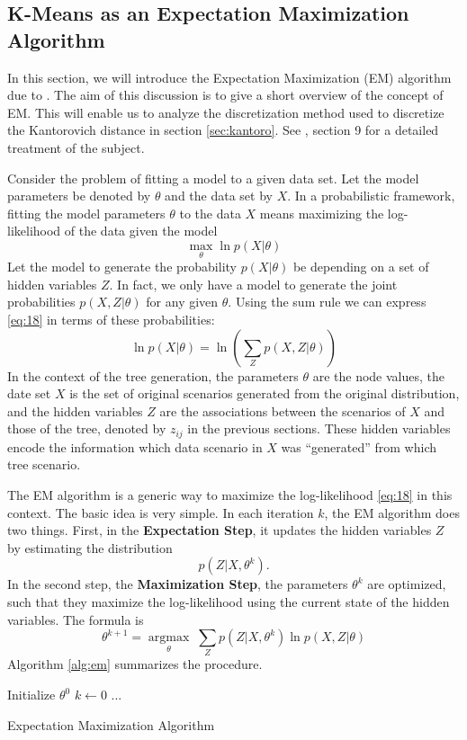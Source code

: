 \subsection{K-Means as an Expectation Maximization Algorithm}
\label{sec:k-means-as-EM}
In this section, we will introduce the Expectation Maximization (EM) algorithm due to \cite{Dempster1977}.
The aim of this discussion is to give a short overview of the concept of EM.
This will enable us to analyze the discretization method used to discretize the Kantorovich distance in section \ref{sec:kantoro}.
See \cite{Bishop2006}, section 9 for a detailed treatment of the subject.

Consider the problem of fitting a model to a given data set.
Let the model parameters be denoted by $\theta$ and the data set by $X$.
In a probabilistic framework, fitting the model parameters $\theta$ to the data $X$ means maximizing the log-likelihood of the data given the model
\begin{equation}
  \label{eq:18}
  \max\limits_\theta \ln p(X|\theta)
\end{equation}
Let the model to generate the probability $p(X|\theta)$ be depending on a set of hidden variables $Z$.
In fact, we only have a model to generate the joint probabilities $p(X,Z|\theta)$ for any given $\theta$.
Using the sum rule we can express \eqref{eq:18} in terms of these probabilities:
\begin{equation}
  \label{eq:19}
  \ln p(X|\theta) = \ln\left(\sum_Zp(X,Z|\theta)\right)
\end{equation}
In the context of the tree generation, the parameters $\theta$ are the node values, the date set $X$ is the set of original scenarios generated from the original distribution, and the hidden variables $Z$ are the associations between the scenarios of $X$ and those of the tree, denoted by $z_{ij}$ in the previous sections.
These hidden variables encode the information which data scenario in $X$ was ``generated'' from which tree scenario.

The EM algorithm is a generic way to maximize the log-likelihood \eqref{eq:18} in this context.
The basic idea is very simple.
In each iteration $k$, the EM algorithm does two things.
First, in the \textbf{Expectation Step}, it updates the hidden variables $Z$ by estimating the distribution
\begin{equation}
  \label{eq:20}
  p(Z|X,\theta^k).
\end{equation}
In the second step, the \textbf{Maximization Step}, the parameters $\theta^k$ are optimized, such that they maximize the log-likelihood using the current state of the hidden variables. The formula is
\begin{equation}
  \label{eq:21}
  \theta^{k+1} = \underset{\theta}{\operatorname{argmax}}\; \sum_Zp(Z|X,\theta^k)\ln p(X,Z|\theta)
\end{equation}
Algorithm \ref{alg:em} summarizes the procedure.
\begin{algorithm}
  Initialize $\theta^0$\;
  $k\leftarrow 0$\;
  ...
  \caption{Expectation Maximization Algorithm}
  \label{alg:em}
\end{algorithm}

